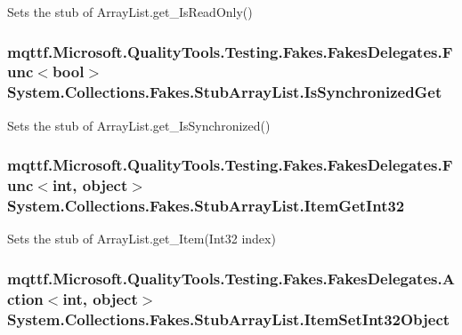 Sets the stub of Array\-List.\-get\-\_\-\-Is\-Read\-Only()

\hypertarget{class_system_1_1_collections_1_1_fakes_1_1_stub_array_list_a3484fc72bc6df7f6f2764062215c92dc}{
\subsubsection[{Is\-Synchronized\-Get}]{\setlength{\rightskip}{0pt plus 5cm}mqttf.\-Microsoft.\-Quality\-Tools.\-Testing.\-Fakes.\-Fakes\-Delegates.\-Func$<$bool$>$ System.\-Collections.\-Fakes.\-Stub\-Array\-List.\-Is\-Synchronized\-Get}}\label{class_system_1_1_collections_1_1_fakes_1_1_stub_array_list_a3484fc72bc6df7f6f2764062215c92dc}


Sets the stub of Array\-List.\-get\-\_\-\-Is\-Synchronized()

\hypertarget{class_system_1_1_collections_1_1_fakes_1_1_stub_array_list_ac9c17792d1fcf8b0aad95f5e5c944e90}{
\subsubsection[{Item\-Get\-Int32}]{\setlength{\rightskip}{0pt plus 5cm}mqttf.\-Microsoft.\-Quality\-Tools.\-Testing.\-Fakes.\-Fakes\-Delegates.\-Func$<$int, object$>$ System.\-Collections.\-Fakes.\-Stub\-Array\-List.\-Item\-Get\-Int32}}\label{class_system_1_1_collections_1_1_fakes_1_1_stub_array_list_ac9c17792d1fcf8b0aad95f5e5c944e90}


Sets the stub of Array\-List.\-get\-\_\-\-Item(\-Int32 index)

\hypertarget{class_system_1_1_collections_1_1_fakes_1_1_stub_array_list_ac7c0b68be143418b8d62ded4ca556e0e}{
\subsubsection[{Item\-Set\-Int32\-Object}]{\setlength{\rightskip}{0pt plus 5cm}mqttf.\-Microsoft.\-Quality\-Tools.\-Testing.\-Fakes.\-Fakes\-Delegates.\-Action$<$int, object$>$ System.\-Collections.\-Fakes.\-Stub\-Array\-List.\-Item\-Set\-Int32\-Object}}\label{class_system_1_1_collections_1_1_fakes_1_1_stub_array_list_ac7c0b68be143418b8d62ded4ca556e0e}



